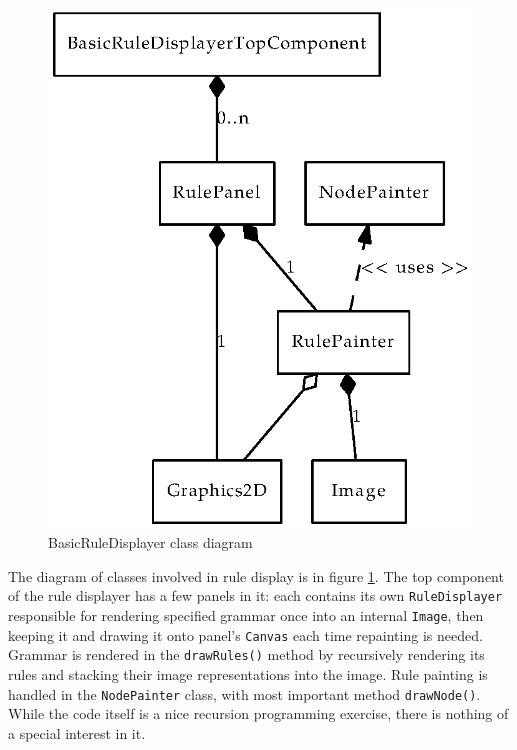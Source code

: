 \documentclass[a4paper,10pt,oneside]{article}
\newcommand{\myscale}{0.74}
\newcommand{\code}[1]{\texttt{#1}}
\begin{document}
\begin{figure}
	\centering\includegraphics[scale=\myscale]{class-diagram}
	\caption{BasicRuleDisplayer class diagram} \label{figure-class-diagram}
\end{figure}

The diagram of classes involved in rule display is in figure \ref{figure-class-diagram}. The top component of the rule displayer has a few panels in it: each contains its own \code{RuleDisplayer} responsible for rendering specified grammar once into an internal \code{Image}, then keeping it and drawing it onto panel's \code{Canvas} each time repainting is needed.\\

Grammar is rendered in the \code{drawRules()} method by recursively rendering its rules and stacking their image representations into the image. Rule painting is handled in the \code{NodePainter} class, with most important method \code{drawNode()}. While the code itself is a nice recursion programming exercise, there is nothing of a special interest in it.\\
\end{document}
